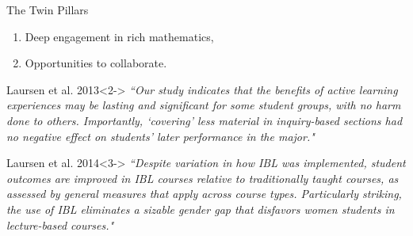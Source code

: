 \documentclass[10pt]{beamer}
\begin{document}
\begin{frame}

\begin{block}{The Twin Pillars}
\begin{enumerate}
\item Deep engagement in rich mathematics,
\item Opportunities to collaborate.
\end{enumerate}
\end{block}

\begin{block}{Laursen et al. 2013}<2->
\emph{``Our study indicates that the benefits of active learning experiences may be lasting and significant for some student groups, with no harm done to others. Importantly, ‘covering’ less material in inquiry-based sections had no negative effect on students' later performance in the major."}
\end{block}

\begin{block}{Laursen et al. 2014}<3->
\emph{``Despite variation in how IBL was implemented, student outcomes are improved in IBL courses relative to traditionally taught courses, as assessed by general measures that apply across course types. Particularly striking, the use of IBL eliminates a sizable gender gap that disfavors women students in lecture-based courses."}
\end{block}

\end{frame}

\end{document}
